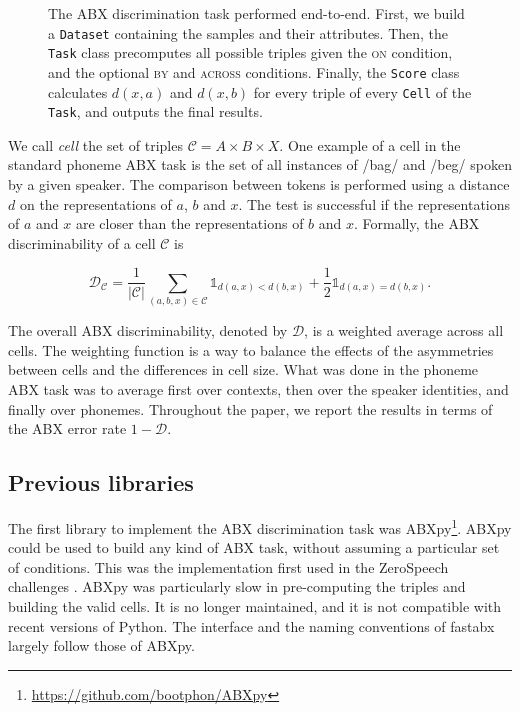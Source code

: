 \documentclass[11pt]{article}
\newcommand{\py}[1]{\texttt{#1}\xspace}
\newcommand{\dataset}{\py{Dataset}}
\newcommand{\cell}{\py{Cell}}
\newcommand{\task}{\py{Task}}
\newcommand{\score}{\py{Score}}
\newcommand{\on}{\textsc{on}\xspace}
\newcommand{\by}{\textsc{by}\xspace}
\newcommand{\across}{\textsc{across}\xspace}
\begin{document}
\begin{figure}
    \centering
    \caption{The ABX discrimination task performed end-to-end. First, we build a \dataset containing the samples and their attributes. Then, the \task class precomputes all possible triples given the \on condition, and the optional \by and \across conditions. Finally, the \score class calculates $d(x, a)$ and $d(x, b)$ for every triple of every \cell of the \task, and outputs the final results.}
    \label{fig:pipeline}
\end{figure}

We call \textit{cell} the set of triples $ \mathcal{C} = A \times B \times X$. One example of a cell in the standard phoneme ABX task is the set of all instances of /bag/ and /beg/ spoken by a given speaker. The comparison between tokens is performed using a distance $d$ on the representations of $a$, $b$ and $x$. The test is successful if the representations of $a$ and $x$ are closer than the representations of $b$ and $x$. Formally, the ABX discriminability of a cell $\mathcal{C}$ is

\[
\mathcal{D}_\mathcal{C} = \frac{1}{|\mathcal{C}|} \sum_{(a, b, x) \in \mathcal{C}} \mathds{1}_{d(a, x) < d(b, x)} + \frac{1}{2} \mathds{1}_{d(a, x) = d(b, x)}.
\]

The overall ABX discriminability, denoted by $\mathcal{D}$, is a weighted average across all cells. The weighting function is a way to balance the effects of the asymmetries between cells and the differences in cell size. What was done in the phoneme ABX task was to average first over contexts, then over the speaker identities, and finally over phonemes. Throughout the paper, we report the results in terms of the ABX error rate $1 - \mathcal{D}$.

\subsection{Previous libraries}

The first library to implement the ABX discrimination task was ABXpy\footnote{\url{https://github.com/bootphon/ABXpy}}. ABXpy could be used to build any kind of ABX task, without assuming a particular set of conditions. This was the implementation first used in the ZeroSpeech challenges \citep{versteegh2015zero,zrc2017,dunbar19_interspeech}. ABXpy was particularly slow in pre-computing the triples and building the valid cells. It is no longer maintained, and it is not compatible with recent versions of Python. The interface and the naming conventions of fastabx largely follow those of ABXpy.
\end{document}
